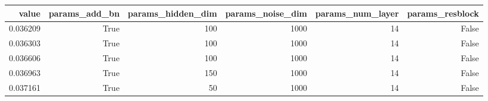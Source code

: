 \begin{tabular}{rrrrrr}
\toprule
value & params_add_bn & params_hidden_dim & params_noise_dim & params_num_layer & params_resblock \\
\midrule
0.036209 & True & 100 & 1000 & 14 & False \\
0.036303 & True & 100 & 1000 & 14 & False \\
0.036606 & True & 100 & 1000 & 14 & False \\
0.036963 & True & 150 & 1000 & 14 & False \\
0.037161 & True & 50 & 1000 & 14 & False \\
\bottomrule
\end{tabular}
